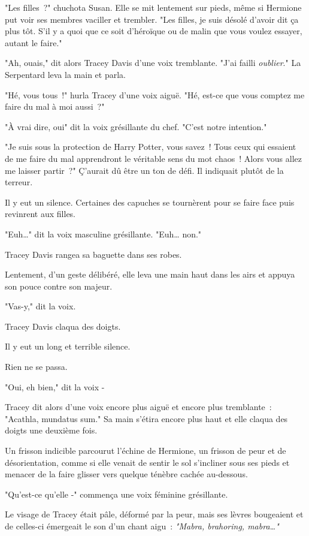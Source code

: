 "Les filles~?" chuchota Susan. Elle se mit lentement sur pieds, même si Hermione put voir ses membres vaciller et trembler. "Les filles, je suis désolé d'avoir dit ça plus tôt. S'il y a quoi que ce soit d'héroïque ou de malin que vous voulez essayer, autant le faire."

"Ah, ouais," dit alors Tracey Davis d'une voix tremblante. "J'ai failli \emph{oublier}." La Serpentard leva la main et parla.

"Hé, vous tous~!" hurla Tracey d'une voix aiguë. "Hé, est-ce que vous comptez me faire du mal à moi aussi~?"

"À vrai dire, oui" dit la voix grésillante du chef. "C'est notre intention."

"Je suis sous la protection de Harry Potter, vous savez~! Tous ceux qui essaient de me faire du mal apprendront le véritable sens du mot chaos~! Alors vous allez me laisser partir~?" Ç'aurait dû être un ton de défi. Il indiquait plutôt de la terreur.

Il y eut un silence. Certaines des capuches se tournèrent pour se faire face puis revinrent aux filles.

"Euh…" dit la voix masculine grésillante. "Euh… non."

Tracey Davis rangea sa baguette dans ses robes.

Lentement, d'un geste délibéré, elle leva une main haut dans les airs et appuya son pouce contre son majeur.

"Vas-y," dit la voix.

Tracey Davis claqua des doigts.

Il y eut un long et terrible silence.

Rien ne se passa.

"Oui, eh bien," dit la voix -

Tracey dit alors d'une voix encore plus aiguë et encore plus tremblante~: "Acathla, mundatus sum." Sa main s'étira encore plus haut et elle claqua des doigts une deuxième fois.

Un frisson indicible parcourut l'échine de Hermione, un frisson de peur et de désorientation, comme si elle venait de sentir le sol s'incliner sous ses pieds et menacer de la faire glisser vers quelque ténèbre cachée au-dessous.

"Qu'est-ce qu'elle -" commença une voix féminine grésillante.

Le visage de Tracey était pâle, déformé par la peur, mais ses lèvres bougeaient et de celles-ci émergeait le son d'un chant aigu~: \emph{"Mabra, brahoring, mabra…"}

